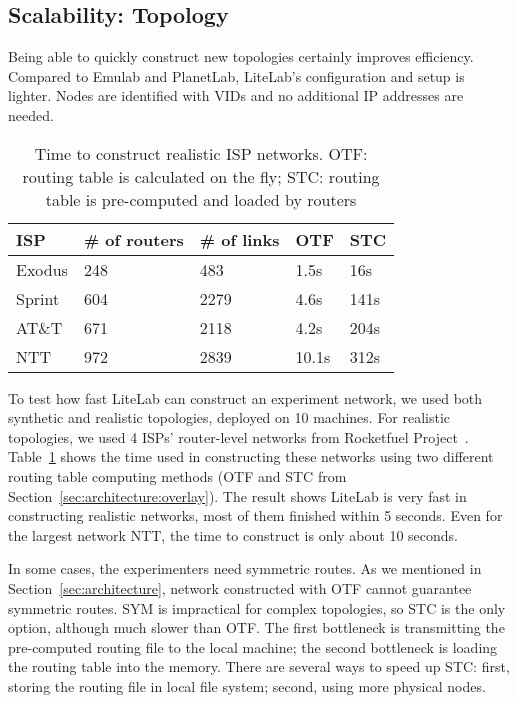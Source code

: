 \documentclass[conference]{IEEEtran}
\begin{document}
\subsection{Scalability: Topology}
\label{sec:evaluation:topology}

Being able to quickly construct new topologies certainly improves
efficiency.  Compared to Emulab and PlanetLab, LiteLab's configuration
and setup is lighter. Nodes are identified with VIDs and no additional
IP addresses are needed.




\begin{table}[!tb]
  \caption{Time to construct realistic ISP networks. OTF: routing
    table is calculated on the fly; STC: routing table is pre-computed
    and loaded by routers} 
  \begin{tabular}{ | p{1.2cm} | p{1.3cm} | p{1.3cm} | p{1.3cm} | p{1.3cm} | }
    \hline
    ISP & \# of routers & \# of links & OTF & STC \\
    \hline
    Exodus & 248 & 483 & 1.5s & 16s \\
    \hline
    Sprint & 604 & 2279 & 4.6s & 141s \\
    \hline
    AT\&T & 671 & 2118 & 4.2s & 204s \\
    \hline
    NTT & 972 & 2839 & 10.1s &  312s\\
    \hline
  \end{tabular}
  \label{sec:evaluation:tab:topology}
  \vskip -5mm
\end{table}

To test how fast LiteLab can construct an experiment network, we used
both synthetic and realistic topologies, deployed on 10 machines. For
realistic topologies, we used 4 ISPs' router-level networks from
Rocketfuel Project~\cite{SpringN:Rocketfuel}.
Table~\ref{sec:evaluation:tab:topology} shows the time used in
constructing these networks using two different routing table
computing methods (OTF and STC from
Section~\ref{sec:architecture:overlay}).  The result shows LiteLab is
very fast in constructing realistic networks, most of them finished
within 5 seconds. Even for the largest network NTT, the time to
construct is only about 10 seconds.

In some cases, the experimenters need symmetric routes. As we
mentioned in Section~\ref{sec:architecture}, network constructed with
OTF cannot guarantee symmetric routes. SYM is impractical for complex
topologies, so STC is the only option, although much slower than
OTF. The first bottleneck is transmitting the pre-computed routing
file to the local machine; the second bottleneck is loading the
routing table into the memory. There are several ways to speed up STC:
first, storing the routing file in local file system; second, using
more physical nodes.
\end{document}

